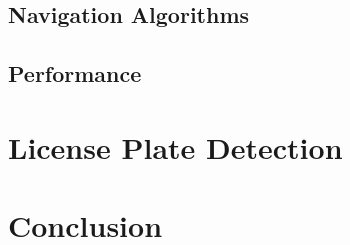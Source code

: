 \documentclass[titlepage]{article}
\begin{document}
            
    \subsection{Navigation Algorithms}
    \subsection{Performance}

\section{License Plate Detection}

\section{Conclusion}
\end{document}
